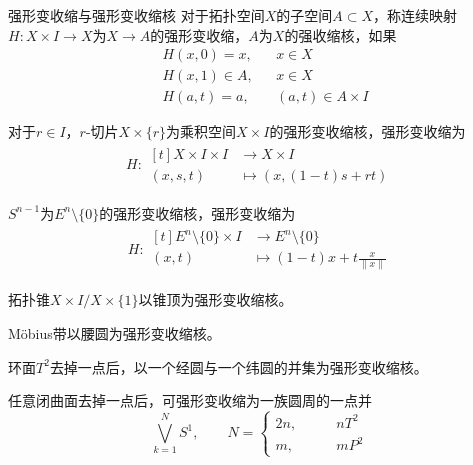 \documentclass[lang = cn, scheme = chinese, thmcnt = section, usesamecnt]{elegantbook}
\newcommand{\sub}{\subset}             %
\begin{document}
\begin{definition}{强形变收缩与强形变收缩核}
	对于拓扑空间$X$的子空间$A\sub X$，称连续映射$H:X\times  I \to X$为$X\to A$的强形变收缩，$A$为$X$的强收缩核，如果
	\begin{align*}
		&H(x,0)=x,&&
		x\in X\\
		&H(x,1)\in A,&&
		x\in X\\
		&H(a,t)=a,&&
		(a,t)\in A\times I
	\end{align*}
\end{definition}

\begin{example}
	对于$r\in I$，$r$-切片$X\times\{r\}$为乘积空间$X\times I$的强形变收缩核，强形变收缩为
	\begin{align*}
		H:\begin{aligned}[t]
			X\times I \times I &\longrightarrow X\times I \\
			(x,s,t)&\longmapsto (x,(1-t)s+rt)
		\end{aligned}
	\end{align*}
\end{example}

\begin{example}
	$S^{n-1}$为$E^n\setminus\{0\}$的强形变收缩核，强形变收缩为
	\begin{align*}
		H:\begin{aligned}[t]
			E^n\setminus\{0\} \times I &\longrightarrow E^n\setminus\{0\} \\
			(x,t)&\longmapsto (1-t)x+t\frac{x}{\|x\|}
		\end{aligned}
	\end{align*}
\end{example}

\begin{example}
	拓扑锥$X\times I/X\times\{1\}$以锥顶为强形变收缩核。
\end{example}

\begin{example}
	Möbius带以腰圆为强形变收缩核。
\end{example}

\begin{example}
	环面$T^2$去掉一点后，以一个经圆与一个纬圆的并集为强形变收缩核。
\end{example}

\begin{example}
	任意闭曲面去掉一点后，可强形变收缩为一族圆周的一点并
	$$
	\bigvee_{k=1}^{N}S^1,\qquad
	N=\begin{cases}
		2n,\qquad & nT^2\\
		m,\qquad & mP^2
	\end{cases}
	$$
\end{example}
\end{document}
